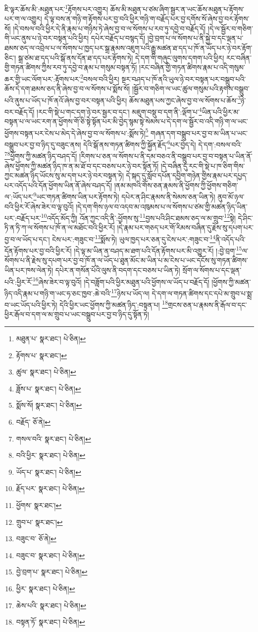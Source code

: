 ཇི་ལྟར་ཆོས་མི་:མཐུན་པར་\footnote{མཐུན་པ་  སྣར་ཐང་།  པེ་ཅིན། }རྟོགས་པར་འགྱུར། ཆོས་མི་མཐུན་པ་ཙམ་ཞིག་སྦྱར་ན་ཡང་ཆོས་མཐུན་པ་རྟོགས་པར་ག་ལ་འགྱུར། དེ་ལྟ་བས་ན་གཉི་ག་རྟོགས་པར་བྱ་བའི་ཕྱིར་གཉི་ག་བརྗོད་པར་བྱ་དགོས་སོ་ཞེས་བྱ་བར་རྟོགས་སོ། །དེ་བསལ་བའི་ཕྱིར་དེ་ནི་རྣམ་པ་གཉིས་ཏེ་ཞེས་བྱ་བ་ལ་སོགས་པ་རབ་ཏུ་དབྱེ་བ་བརྗོད་དོ། །དེ་ལ་སྦྱོར་བ་གཅིག་གི་ཡང་ནུས་པ་ཉེ་བར་བསྟན་པའི་ཕྱིར། དཔེར་བརྗོད་པ་བསྙད་དོ། །བྱེ་བྲག་པ་ལ་སོགས་པ་ནི་སྐྱེ་བ་དང་ལྡན་པ་ཐམས་ཅད་ལ་འབྲེལ་པ་ལ་སོགས་པ་ཁྱད་པར་སྒྲ་རྣམས་འཇུག་པའི་རྒྱུ་མཚན་ཐ་དད་པ་ཁོ་ན་ཡོད་པར་ཉེ་བར་རྟོག་ཅིང་། སྒྲ་ཙམ་ཐ་དད་པའི་སྒོ་ནས་དོན་ཐ་དད་པར་རྟོགས་ཏེ། དེ་དག་གི་གཞུང་ལུགས་དགག་པའི་ཕྱིར། རང་བཞིན་གྱི་གཏན་ཚིགས་ཀྱིས་རབ་ཏུ་དབྱེ་བ་རྣམ་པ་གསུམ་བསྟན་ཏོ། །རང་བཞིན་གྱི་གཏན་ཚིགས་རྣམ་པ་འདི་གསུམ་ཆར་གྱི་ཡང་ལོག་པར་:རྟོགས་པར་\footnote{རྟོགས་པ་  སྣར་ཐང་། }བསལ་བའི་ཕྱིར། སྔར་བཤད་པ་ཁོ་ནའི་ཡུལ་ཉེ་བར་བསྟན་པར་བསྒྲུབ་པའི་ཆོས་དེ་དག་ཐམས་ཅད་ནི་ཞེས་བྱ་བ་ལ་སོགས་པ་སྨོས་སོ། །སྦྱོར་བ་གཅིག་ལ་ཡང་ཚུལ་གསུམ་པའི་རྟགས་བསྒྲུབ་པའི་ནུས་པ་ཡོད་པ་ཁོ་ནའོ་ཞེས་བྱ་བར་བསྟན་པའི་ཕྱིར། ཆོས་མཐུན་པས་ཀྱང་ཞེས་བྱ་བ་ལ་སོགས་པ་ཆོས་\footnote{ཚུལ་  སྣར་ཐང་།  པེ་ཅིན། }ཉེ་བར་བརྗོད་དོ། །རང་གི་སྡེ་པ་གང་དག་ཉེ་བར་སྦྱར་བ་དང་། མཇུག་བསྡུ་བ་དག་ནི་:ལྡོག་པ་\footnote{ཟློས་པ་  སྣར་ཐང་།  པེ་ཅིན། }ཡིན་པའི་ཕྱིར་མ་བསྟན་པ་ལ་ཡང་རག་ན་ཕྱོགས་གོ་ཅི་སྟེ་སྟོན་པར་མི་བྱེད་སྙམ་སྟེ་སེམས་པ་དེ་དག་ལ་སྦྱོར་བ་འདི་གཉི་ག་ལ་ཡང་ཕྱོགས་བསྟན་པར་ངེས་པ་མེད་དེ་ཞེས་བྱ་བ་ལ་སོགས་པ་:སྨོས་ཏེ།\footnote{སྨོས་སོ།  སྣར་ཐང་།  པེ་ཅིན། } གཞན་དག་བསྒྲུབ་པར་བྱ་བ་མ་ཡིན་པ་ཡང་བསྒྲུབ་པར་བྱ་བ་ཉིད་དུ་བཟུང་ནས། དེའི་སྒོ་ནས་གཏན་ཚིགས་ཀྱི་སྐྱོན་རྗོད་\footnote{བརྗོད་  ཅོ་ནེ། }པར་བྱེད་དེ། དེ་དག་:བསལ་བའི་\footnote{གསལ་བའི་  སྣར་ཐང་།  པེ་ཅིན། }\footnote{བའི་ཕྱིར་  སྣར་ཐང་།  པེ་ཅིན། }ཕྱོགས་ཀྱི་མཚན་ཉིད་བཤད་དོ། །རིགས་པ་ཅན་ལ་སོགས་པ་ནི་དམ་བཅའ་ནི་བསྒྲུབ་པར་བྱ་བ་བསྟན་པ་ཡིན་ནོ་ཞེས་ཕྱོགས་ཀྱི་མཚན་ཉིད་ཁ་ན་མ་ཐོ་བ་དང་བཅས་པར་ཉེ་བར་སྟོན་ཏོ། །དེ་བཞིན་དུ་རང་གི་སྡེ་པ་ཁ་ཅིག་གིས་ཀྱང་མཚན་ཉིད་ཡོངས་སུ་མ་དག་པར་ཉེ་བར་བསྟན་ཏེ། དེ་སྐད་དུ་སློབ་དཔོན་དབྱིག་གཉེན་གྱིས་རྣམ་པར་དཔྱད་པར་འདོད་པའི་དོན་ཕྱོགས་ཡིན་ནོ་ཞེས་བཤད་དོ། །ནམ་མཁའི་གོས་ཅན་རྣམས་ནི་ཕྱོགས་ཀྱི་ཕྱོགས་གཅིག་ལ་:ཡོད་པར་\footnote{ཡོད་པ་  སྣར་ཐང་།  པེ་ཅིན། }ཡང་གཏན་ཚིགས་ཡིན་པར་རྟོགས་ཏེ། དཔེར་ན་ཤིང་རྣམས་ནི་སེམས་ཅན་ཡིན་ཏེ། ནུབ་མོ་ཉལ་བའི་ཕྱིར་རོ་ཞེས་ཟེར་བ་ལྟ་བུའོ། །དེ་དག་གིས་ཉལ་བ་འདབ་མ་འཁུམས་པ་ལ་སོགས་པ་ཙམ་གྱི་མཚན་ཉིད་ཡིན་པར་:བརྗོད་པར་\footnote{རྗོད་པར་  སྣར་ཐང་།  པེ་ཅིན། }འདོད་མོད་ཀྱི། འོན་ཀྱང་འདི་ནི་:ཕྱོགས་སུ་\footnote{ཕྱོགས་  སྣར་ཐང་། }བྱས་པའི་ཤིང་ཐམས་ཅད་ལ་མ་གྲུབ་\footnote{གྲུབ་པ་  སྣར་ཐང་། }སྟེ། དེ་ཤིང་ཏི་ན་ཏི་ཀ་ལ་སོགས་པ་ཁོ་ན་ལ་མཐོང་བའི་ཕྱིར་རོ། །དེ་རྣམ་པར་གཅད་པར་གོ་རིམས་བཞིན་དུ་རྗེས་སུ་དཔག་པར་བྱ་བ་ལ་ཡོད་པ་དང་། ངེས་པར་:གཟུང་བ་\footnote{བཟུང་བ་  ཅོ་ནེ། }སྨོས་ཏེ། ཡུལ་ཁྱད་པར་ཅན་དུ་ངེས་པར་:གཟུང་བ་\footnote{བཟུང་བ་  སྣར་ཐང་།  པེ་ཅིན། }ནི་འདོད་པའི་དོན་རྟོགས་པར་བྱ་བའི་ཕྱིར་རོ། །དེ་ལྟ་མ་ཡིན་ན་བཤད་མ་ཐག་པའི་དོན་རྟོགས་པར་མི་འགྱུར་རོ། །:བྱེ་བྲག་\footnote{བྱེ་བྲག་པ་  སྣར་ཐང་།  པེ་ཅིན། }ལ་སོགས་པ་ནི་རྗེས་སུ་དཔག་པར་བྱ་བ་ཁོ་ན་ལ་ཡོད་པ་ཐུན་མོང་མ་ཡིན་པ་མ་ངེས་པ་ཡང་དངོས་སུ་གཏན་ཚིགས་ཡིན་པར་ཁས་ལེན་ཏེ། དཔེར་ན་གསོན་པོའི་ལུས་ནི་བདག་དང་བཅས་པ་ཡིན་ཏེ། སྲོག་ལ་སོགས་པ་དང་ལྡན་པའི་:ཕྱིར་རོ་\footnote{ཕྱིར་  སྣར་ཐང་།  པེ་ཅིན། }ཞེས་ཟེར་བ་ལྟ་བུའོ། །དེ་བཟློག་པའི་ཕྱིར་མཐུན་པའི་ཕྱོགས་ལ་ཡོད་པ་བརྗོད་དོ། །ཕྱོགས་ཀྱི་མཚན་ཉིད་འདི་རྣམ་པ་གཉི་ག་ཡང་ཧ་ཅང་ཁྱབ་:ཆེ་བའི་\footnote{ཆེས་པའི་  སྣར་ཐང་།  པེ་ཅིན། }ཉེས་པ་ཡོད་ལ། དེ་དག་ལ་གཏན་ཚིགས་དང་དཔེ་མ་གྲུབ་པ་སྨྲ་བ་ཡང་ཡོད་པའི་ཕྱིར་ཏེ། དེའི་ཕྱིར་ཡང་ཕྱོགས་ཀྱི་མཚན་ཉིད་:བསྟན་པ། \footnote{བསྟན་ཏོ་  སྣར་ཐང་།  པེ་ཅིན། }གྲངས་ཅན་པ་རྣམས་ནི་རྒོལ་བ་དང་ཕྱིར་རྒོལ་བ་དག་ལ་མ་གྲུབ་པ་ཡང་བསྒྲུབ་པར་བྱ་བ་ཉིད་དུ་སྟོན་ཏེ། 